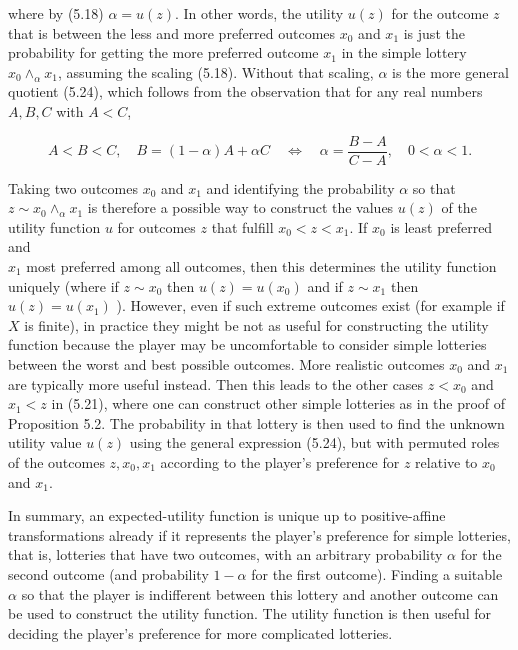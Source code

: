 \documentclass[12pt]{article}
\begin{document}
where by (5.18) $\alpha=u(z)$. In other words, the utility $u(z)$ for the outcome $z$ that is between the less and more preferred outcomes $x_{0}$ and $x_{1}$ is just the probability for getting the more preferred outcome $x_{1}$ in the simple lottery $x_{0} \wedge_{\alpha} x_{1}$, assuming the scaling (5.18). Without that scaling, $\alpha$ is the more general quotient (5.24), which follows from the observation that for any real numbers $A, B, C$ with $A<C$,


\begin{equation*}
A<B<C, \quad B=(1-\alpha) A+\alpha C \quad \Leftrightarrow \quad \alpha=\frac{B-A}{C-A}, \quad 0<\alpha<1 . \tag{5.25}
\end{equation*}


Taking two outcomes $x_{0}$ and $x_{1}$ and identifying the probability $\alpha$ so that $z \sim x_{0} \wedge_{\alpha} x_{1}$ is therefore a possible way to construct the values $u(z)$ of the utility function $u$ for outcomes $z$ that fulfill $x_{0}<z<x_{1}$. If $x_{0}$ is least preferred and\\
$x_{1}$ most preferred among all outcomes, then this determines the utility function uniquely (where if $z \sim x_{0}$ then $u(z)=u\left(x_{0}\right)$ and if $z \sim x_{1}$ then $u(z)=u\left(x_{1}\right)$ ). However, even if such extreme outcomes exist (for example if $X$ is finite), in practice they might be not as useful for constructing the utility function because the player may be uncomfortable to consider simple lotteries between the worst and best possible outcomes. More realistic outcomes $x_{0}$ and $x_{1}$ are typically more useful instead. Then this leads to the other cases $z<x_{0}$ and $x_{1}<z$ in (5.21), where one can construct other simple lotteries as in the proof of Proposition 5.2. The probability in that lottery is then used to find the unknown utility value $u(z)$ using the general expression (5.24), but with permuted roles of the outcomes $z, x_{0}, x_{1}$ according to the player's preference for $z$ relative to $x_{0}$ and $x_{1}$.

In summary, an expected-utility function is unique up to positive-affine transformations already if it represents the player's preference for simple lotteries, that is, lotteries that have two outcomes, with an arbitrary probability $\alpha$ for the second outcome (and probability $1-\alpha$ for the first outcome). Finding a suitable $\alpha$ so that the player is indifferent between this lottery and another outcome can be used to construct the utility function. The utility function is then useful for deciding the player's preference for more complicated lotteries.
\end{document}
